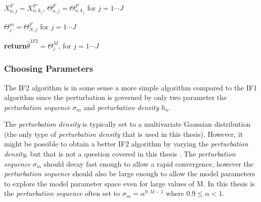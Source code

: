\documentclass[twoside,openright]{report}
\begin{document}
\begin{algorithm}
\begin{algorithmic}
            \State   $X^{F}_{n,j} = X^P_{n,k_j }$, $\Theta^{F}_{n,j} = \Theta^{P}_{n,k_j }$ for $j = 1 \cdots J$ 
            

        \EndFor
        
        \State $\Theta^{m}_j = \Theta^{F}_{N,j}$ for $j = 1 \cdots J$  
    
    \EndFor

\State \textbf{return}$\hat{\theta}^{IF2} = \Theta^M_j$,  for $j = 1 \cdots J$  

\end{algorithmic}
\end{algorithm}


\subsubsection{Choosing Parameters}

The IF2 algorithm is in some sense a more simple algorithm compared to the IF1 algorithm since the perturbation is governed by only two parameter the  \textit{perturbation sequence}  $\sigma_m$  and  \textit{perturbation density} $h_n$. %

The \textit{perturbation density} is typically set to a multivariate Gaussian distribution (the only type of \textit{perturbation density} that is used in this thesis). However, it might be possible to obtain a better IF2 algorithm by varying the \textit{perturbation density}, but that is not a question covered in this thesis  . The \textit{perturbation sequence}  $\sigma_m$ should decay fast enough to allow a rapid convergence, however the \textit{perturbation sequence}  should also be large  enough  to allow the model parameters to explore the model parameter space even for large values of M. In this thesis is the \textit{perturbation sequence} often set to $\sigma_m = \alpha^{0:M-1}$ where $0.9 \leq \alpha < 1$.  
\end{document}
